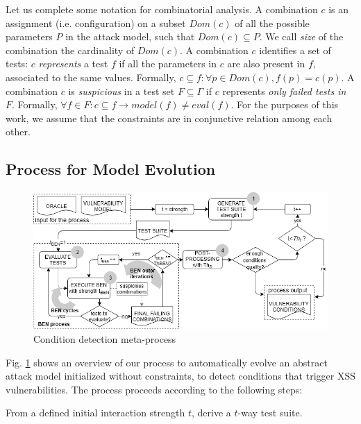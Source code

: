 \begin{tikzborder}{\cite{Gargantini16:validation}}
\begin{tikzborder}{\cite{gargantini_combinatorial_2017}}
\begin{tikzborder}{\cite{gargantini_combinatorial_2017}}
\begin{tikzborder}{\cite{garn2019}}
Let us complete some notation for combinatorial analysis.
A combination $c$ is an assignment (i.e. configuration) on a subset $Dom(c)$ of all the possible parameters $P$ in the attack model, such that 
$Dom(c) \subseteq P$.
We call \emph{size} of the combination the cardinality of $Dom(c)$.
A combination $c$ identifies %
a set of tests: $c$ \textit{represents} a test $f$ if all the parameters in $c$ are also present in $f$, associated to the same values. Formally, $c \subseteq f: \forall p \in Dom(c), f(p) = c(p)$.
A combination $c$ is \textit{suspicious} in a test set $F \subseteq \Gamma $ if $c$ represents \emph{only failed tests in $F$}. Formally, $\forall f \in F: c \subseteq f \rightarrow model(f) \neq eval(f)$.
For the purposes of this work, we assume that the constraints are in conjunctive relation among each other.
\be 

\subsection{Process for Model Evolution}\label{sec:xssprocess}

\begin{figure}[!hbt]
\centering
\includegraphics[width=.91\textwidth]{metaprocess.png}
\caption{Condition detection meta-process}\label{fig:metaprocess}
\end{figure}

\bb Fig. \ref{fig:metaprocess} shows an overview of our process to automatically evolve an abstract attack model initialized without constraints, to detect conditions that trigger XSS vulnerabilities.
The process proceeds according to the following steps:

\begin{inparaenum}

\item From a defined initial interaction strength $t$,  derive a  $t$-way test suite.


\end{inparaenum}
\end{tikzborder}
\end{tikzborder}
\end{tikzborder}
\end{tikzborder}
